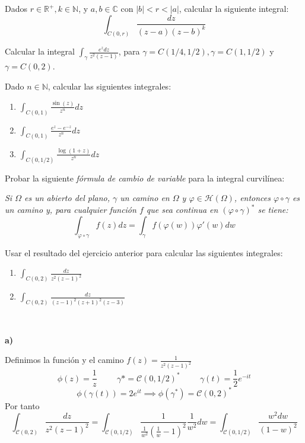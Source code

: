 \begin{ejer}
	Dados $r\in\mathbb{R}^+,k\in\mathbb{N}$, y $a,b\in\mathbb{C}$ con $|b|<r<|a|$, calcular la siguiente integral:
	$$ \int_{C(0,r)}\frac{dz}{(z-a)(z-b)^k} $$
\end{ejer}

\begin{ejer}
	Calcular la integral $\int_{\gamma}\frac{e^zdz}{z^2(z-1)}$, para $\gamma=C(1/4,1/2), \gamma=C(1,1/2)$ y $\gamma=C(0,2)$.
\end{ejer}

\begin{ejer}
	Dado $n\in\mathbb{N}$, calcular las siguientes integrales:
	\begin{enumerate}[label=(\alph*)]
		\item $\int_{C(0,1)}\frac{\sin(z)}{z^n}dz$
		\item $\int_{C(0,1)}\frac{e^z-e^{-z}}{z^n}dz$
		\item $\int_{C(0,1/2)}\frac{\log(1+z)}{z^n}dz$
	\end{enumerate}
\end{ejer}

\begin{ejer}
	Probar la siguiente \textit{fórmula de cambio de variable} para la integral curvilínea:
	
	\textit{Si $\Omega$ es un abierto del plano, $\gamma$ un camino en $\Omega$ y $\varphi\in\mathcal{H}(\Omega)$, entonces $\varphi\circ\gamma$ es un camino y, para cualquier función $f$ que sea continua en $(\varphi\circ\gamma)^{\ast}$ se tiene:}
	$$ \int_{\varphi\circ\gamma} f(z)dz = \int_{\gamma}f(\varphi(w))\varphi'(w)dw $$
\end{ejer}

\begin{ejer}
	Usar el resultado del ejercicio anterior para calcular las siguientes integrales:
	\begin{enumerate}[label=(\alph*)]
		\item $\int_{C(0,2)}\frac{dz}{z^2(z-1)^2}$
		\item $\int_{C(0,2)}\frac{dz}{(z-1)^2(z+1)^2(z-3)}$
	\end{enumerate}
\end{ejer}

\begin{sol}

\

\textbf{a)}

Definimos la función y el camino
$f(z) = \frac{1}{z^2(z-1)^2}$
$$ \phi(z) = \frac{1}{z} \hspace{1cm} \gamma{\ast} = \mathcal{C}(0,1/2)^{\ast} \hspace{1cm} \gamma(t) = \frac{1}{2}e^{-it} $$
$$ \phi(\gamma(t)) = 2e^{it}\implies \phi(\gamma^{\ast}) = \mathcal{C}(0,2)^{\ast}$$
Por tanto
$$\int_{\mathcal{C}(0,2)} \frac{dz}{z^2(z-1)^2} = \int_{\mathcal{C}(0,1/2)} \frac{1}{ \frac{1}{w^2} (\frac{1}{w}-1)^2} \frac{1}{w^2} dw = \int_{\mathcal{C}(0,1/2)} \frac{w^2dw}{(1-w)^2}$$
\end{sol}